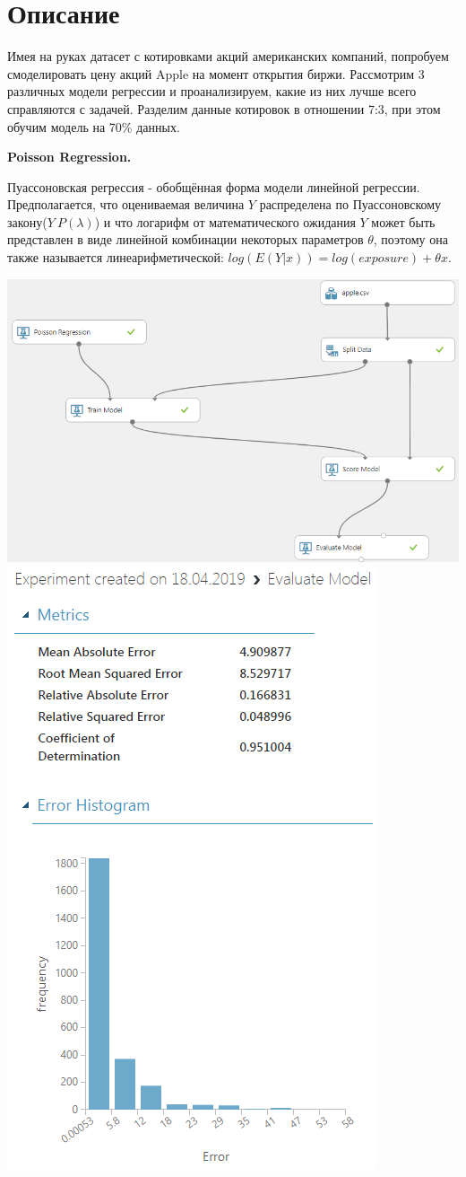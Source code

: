 \section{Описание}

Имея на руках датасет с котировками акций американских компаний, попробуем смоделировать цену акций Apple на момент открытия биржи. Рассмотрим 3 различных модели регрессии и проанализируем, какие из них лучше всего справляются с задачей. Разделим данные котировок в отношении 7:3, при этом обучим модель на 70\% данных.

{\bfseries Poisson Regression.}

Пуассоновская регрессия - обобщённая форма модели линейной регрессии. Предполагается, что оцениваемая величина $Y$ распределена по Пуассоновскому закону($Y~P(\lambda)$) и что логарифм от математического ожидания $Y$ может быть представлен в виде линейной комбинации некоторых параметров $\theta$, поэтому она также называется линеарифметической: $log(E(Y|x))=log(exposure)+\theta x$.

\includegraphics[width=0.7\linewidth]{src/pics/poisson2.png}
\includegraphics[width=0.3\linewidth]{src/pics/poisson1.png}

